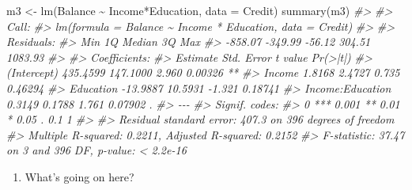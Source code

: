 \documentclass[
]{book}
\newenvironment{Shaded}{\begin{snugshade}}{\end{snugshade}}
\newcommand{\AttributeTok}[1]{\textcolor[rgb]{0.77,0.63,0.00}{#1}}
\newcommand{\CommentTok}[1]{\textcolor[rgb]{0.56,0.35,0.01}{\textit{#1}}}
\newcommand{\FunctionTok}[1]{\textcolor[rgb]{0.00,0.00,0.00}{#1}}
\newcommand{\NormalTok}[1]{#1}
\newcommand{\OtherTok}[1]{\textcolor[rgb]{0.56,0.35,0.01}{#1}}
\newcommand{\SpecialCharTok}[1]{\textcolor[rgb]{0.00,0.00,0.00}{#1}}
\providecommand{\tightlist}{%
  \setlength{\itemsep}{0pt}\setlength{\parskip}{0pt}}
\begin{document}
\begin{Shaded}
\begin{Highlighting}[]
\NormalTok{m3 }\OtherTok{\textless{}{-}} \FunctionTok{lm}\NormalTok{(Balance }\SpecialCharTok{\textasciitilde{}}\NormalTok{ Income}\SpecialCharTok{*}\NormalTok{Education, }\AttributeTok{data =}\NormalTok{ Credit)}
\FunctionTok{summary}\NormalTok{(m3)}
\CommentTok{\#\textgreater{} }
\CommentTok{\#\textgreater{} Call:}
\CommentTok{\#\textgreater{} lm(formula = Balance \textasciitilde{} Income * Education, data = Credit)}
\CommentTok{\#\textgreater{} }
\CommentTok{\#\textgreater{} Residuals:}
\CommentTok{\#\textgreater{}     Min      1Q  Median      3Q     Max }
\CommentTok{\#\textgreater{} {-}858.07 {-}349.99  {-}56.12  304.51 1083.93 }
\CommentTok{\#\textgreater{} }
\CommentTok{\#\textgreater{} Coefficients:}
\CommentTok{\#\textgreater{}                  Estimate Std. Error t value Pr(\textgreater{}|t|)   }
\CommentTok{\#\textgreater{} (Intercept)      435.4599   147.1000   2.960  0.00326 **}
\CommentTok{\#\textgreater{} Income             1.8168     2.4727   0.735  0.46294   }
\CommentTok{\#\textgreater{} Education        {-}13.9887    10.5931  {-}1.321  0.18741   }
\CommentTok{\#\textgreater{} Income:Education   0.3149     0.1788   1.761  0.07902 . }
\CommentTok{\#\textgreater{} {-}{-}{-}}
\CommentTok{\#\textgreater{} Signif. codes:  }
\CommentTok{\#\textgreater{} 0 \textquotesingle{}***\textquotesingle{} 0.001 \textquotesingle{}**\textquotesingle{} 0.01 \textquotesingle{}*\textquotesingle{} 0.05 \textquotesingle{}.\textquotesingle{} 0.1 \textquotesingle{} \textquotesingle{} 1}
\CommentTok{\#\textgreater{} }
\CommentTok{\#\textgreater{} Residual standard error: 407.3 on 396 degrees of freedom}
\CommentTok{\#\textgreater{} Multiple R{-}squared:  0.2211, Adjusted R{-}squared:  0.2152 }
\CommentTok{\#\textgreater{} F{-}statistic: 37.47 on 3 and 396 DF,  p{-}value: \textless{} 2.2e{-}16}
\end{Highlighting}
\end{Shaded}

\begin{enumerate}
\def\labelenumi{\arabic{enumi}.}
\setcounter{enumi}{6}
\tightlist
\item
  What's going on here?
\end{enumerate}
\end{document}
